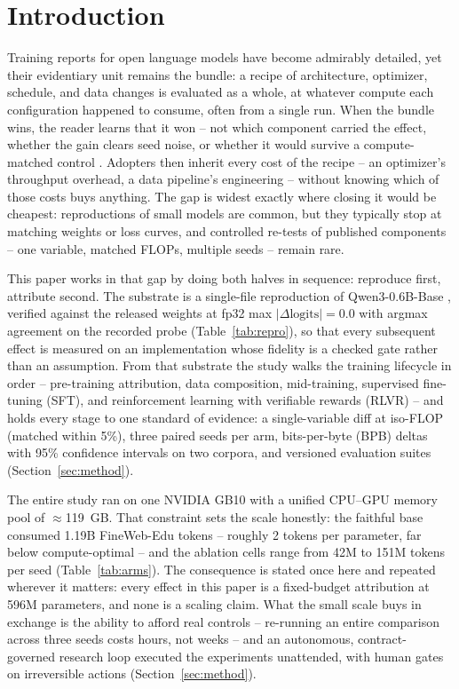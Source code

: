 \section{Introduction}\label{sec:intro}

Training reports for open language models have become admirably detailed, yet
their evidentiary unit remains the bundle: a recipe of architecture,
optimizer, schedule, and data changes is evaluated as a whole, at whatever
compute each configuration happened to consume, often from a single run. When
the bundle wins, the reader learns that it won -- not which component carried
the effect, whether the gain clears seed noise, or whether it would survive a
compute-matched control \citep{hoffmann2022training}. Adopters then inherit
every cost of the recipe -- an optimizer's throughput overhead, a data
pipeline's engineering -- without knowing which of those costs buys anything.
The gap is widest exactly where closing it would be cheapest: reproductions of
small models are common, but they typically stop at matching weights or loss
curves, and controlled re-tests of published components -- one variable,
matched FLOPs, multiple seeds -- remain rare.

This paper works in that gap by doing both halves in sequence: reproduce
first, attribute second. The substrate is a single-file reproduction of
Qwen3-0.6B-Base \citep{yang2025qwen3}, verified against the released weights
at fp32 max $|\Delta\mathrm{logits}| = 0.0$ with argmax agreement on the
recorded probe (Table~\ref{tab:repro}), so that every subsequent effect is
measured on an implementation whose fidelity is a checked gate rather than an
assumption. From that substrate the study walks the training lifecycle in
order -- pre-training attribution, data composition, mid-training, supervised
fine-tuning (SFT), and reinforcement learning with verifiable rewards (RLVR)
-- and holds every stage to one standard of evidence: a single-variable diff
at iso-FLOP (matched within 5\%), three paired seeds per arm, bits-per-byte
(BPB) deltas with 95\% confidence intervals on two corpora, and versioned
evaluation suites (Section~\ref{sec:method}).

The entire study ran on one NVIDIA GB10 with a unified CPU--GPU memory pool of
$\approx$119~GB. That constraint sets the scale honestly: the faithful base
consumed 1.19B FineWeb-Edu tokens \citep{penedo2024fineweb} -- roughly 2
tokens per parameter, far below compute-optimal
\citep{hoffmann2022training} -- and the ablation cells range from 42M to 151M
tokens per seed (Table~\ref{tab:arms}). The consequence is stated once here
and repeated wherever it matters: every effect in this paper is a fixed-budget
attribution at 596M parameters, and none is a scaling claim. What the small
scale buys in exchange is the ability to afford real controls -- re-running an
entire comparison across three seeds costs hours, not weeks -- and an
autonomous, contract-governed research loop executed the experiments
unattended, with human gates on irreversible actions
(Section~\ref{sec:method}).

